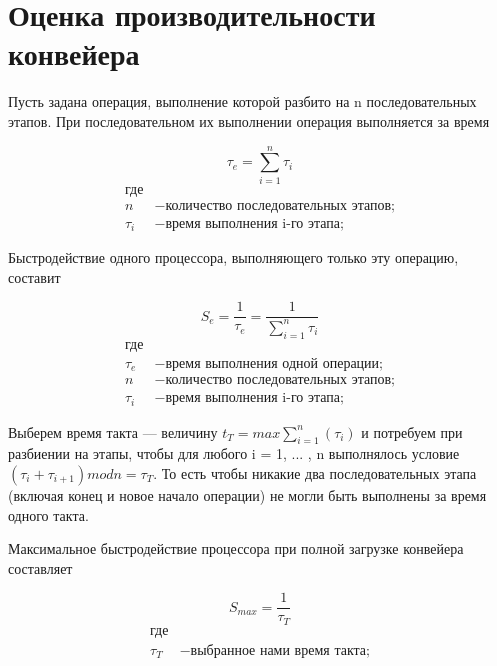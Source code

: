 \documentclass[a4paper,14pt]{report}
\begin{document}
\section*{Оценка производительности конвейера}

Пусть задана операция, выполнение которой разбито на n последовательных этапов. При последовательном их выполнении операция выполняется за время

\begin{equation}\label{form:way}
 \tau _{e}={\sum\limits_{i=1}^n \tau _{i}}
 \end{equation}
 \begin{align*}
    \text{где} \\
    n &- \text{количество последовательных этапов;} \\
   \tau _{i} &- \text{время выполнения i-го этапа;}
\end{align*}

Быстродействие одного процессора, выполняющего только эту операцию, составит

\begin{equation}\label{form:way}
 S_{e}={\frac{1}{\tau _{e}}}={\frac{1}{\sum\limits_{i=1}^n \tau _{i}}}
 \end{equation}
 \begin{align*}
    \text{где} \\
    \tau _{e} &- \text{время выполнения одной операции;} \\
    n &- \text{количество последовательных этапов;} \\
   \tau _{i} &- \text{время выполнения i-го этапа;}
\end{align*}

Выберем время такта — величину $t _{T} = max{\sum\limits_{i=1}^n(\tau_{i})}$ и потребуем при разбиении на этапы, чтобы для любого i = 1, ... , n выполнялось условие $(\tau_{i} + \tau_{i+1}) mod n = \tau_{T}$. То есть чтобы никакие два последовательных этапа (включая конец и новое начало операции) не могли быть выполнены за время одного такта.

Максимальное быстродействие процессора при полной загрузке конвейера составляет

\begin{equation}\label{form:way}
 S_{max}={\frac{1}{\tau _{T}}}
 \end{equation}
 \begin{align*}
    \text{где} \\
    \tau _{T} &- \text{выбранное нами время такта;}
\end{align*}
\end{document}
